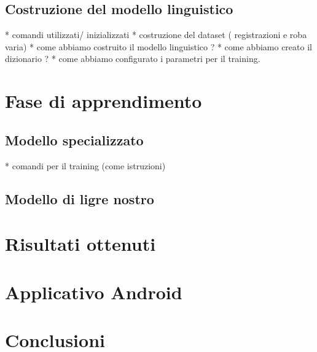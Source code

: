 \documentclass[12pt]{article}
\begin{document}
    \subsection{Costruzione del modello linguistico}
    
    
    * comandi utilizzati/ inizializzati
    * costruzione del dataset ( registrazioni e roba varia)
    * come abbiamo costruito il modello linguistico ? 
    * come abbiamo creato il dizionario ? 
    * come abbiamo configurato i parametri per il training.

\section{Fase di apprendimento}
    \subsection{Modello specializzato}
    * comandi per il training (come istruzioni)
    \subsection{Modello di ligre nostro}

\section{Risultati ottenuti}


\section{Applicativo Android}


\section{Conclusioni}
\end{document}
